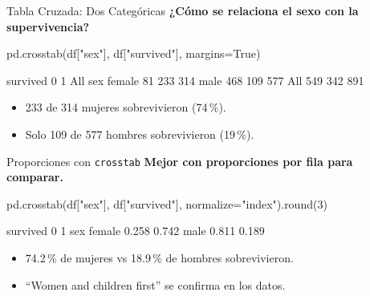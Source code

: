 \documentclass[aspectratio=169, 11pt]{beamer}
\begin{document}
\begin{frame}[fragile,shrink=28]{Tabla Cruzada: Dos Categóricas}
  \vspace{-6pt}
  {\footnotesize\color{arcaDark}\bfseries
    ¿Cómo se relaciona el sexo con la supervivencia?}

  \vspace{4pt}
  \begin{pyblock}
pd.crosstab(df["sex"], df["survived"],
            margins=True)
  \end{pyblock}

  \vspace{4pt}
  \begin{outputblock}
survived    0    1  All
sex
female     81  233  314
male      468  109  577
All       549  342  891
  \end{outputblock}

  \vspace{4pt}
  {\scriptsize\color{textMuted}
  \begin{itemize}\setlength{\itemsep}{3pt}
    \item[{\color{arcaRed}\scriptsize\faArrowRight}]
      233 de 314 mujeres sobrevivieron (74\,\%).
    \item[{\color{arcaRed}\scriptsize\faArrowRight}]
      Solo 109 de 577 hombres sobrevivieron (19\,\%).
  \end{itemize}
  }
\end{frame}

\begin{frame}[fragile,shrink=28]{Proporciones con \texttt{crosstab}}
  \vspace{-6pt}
  {\footnotesize\color{arcaDark}\bfseries
    Mejor con proporciones por fila para comparar.}

  \vspace{4pt}
  \begin{pyblock}
pd.crosstab(df["sex"], df["survived"],
            normalize="index").round(3)
  \end{pyblock}

  \vspace{4pt}
  \begin{outputblock}
survived      0      1
sex
female    0.258  0.742
male      0.811  0.189
  \end{outputblock}

  \vspace{4pt}
  {\scriptsize\color{textMuted}
  \begin{itemize}\setlength{\itemsep}{3pt}
    \item[{\color{arcaRed}\scriptsize\faArrowRight}]
      74.2\,\% de mujeres vs 18.9\,\% de hombres sobrevivieron.
    \item[{\color{codeOrange}\scriptsize\faLightbulb}]
      ``Women and children first'' se confirma en los datos.
  \end{itemize}
  }
\end{frame}
\end{document}
